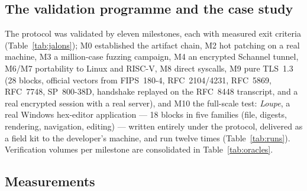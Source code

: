 \documentclass[11pt,a4paper]{article}
\begin{document}
\subsection{The validation programme and the case study}\label{sec:cas}

The protocol was validated by eleven milestones, each with measured exit
criteria (Table~\ref{tab:jalons}); M0 established the artifact chain,
M2 hot patching on a real machine, M3 a million-case fuzzing campaign,
M4 an encrypted Schannel tunnel, M6/M7 portability to Linux and RISC-V,
M8 direct syscalls, M9 pure TLS~1.3 (28 blocks, official vectors from
FIPS~180-4, RFC~2104/4231, RFC~5869, RFC~7748, SP~800-38D, handshake
replayed on the RFC~8448 transcript, and a real encrypted session with a
real server), and M10 the full-scale test: \emph{Loupe}, a real Windows
hex-editor application --- 18 blocks in five families (file, digests,
rendering, navigation, editing) --- written entirely under the protocol,
delivered as a field kit to the developer's machine, and run twelve times
(Table~\ref{tab:runs}). Verification volumes per milestone are
consolidated in Table~\ref{tab:oracles}.

\subsection{Measurements}\label{sec:mesures}
\end{document}
